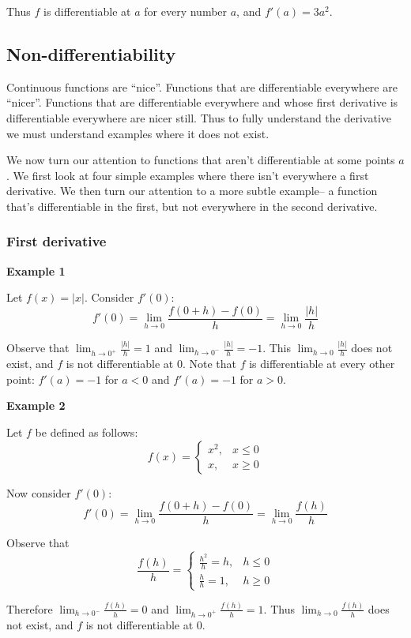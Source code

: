 Thus $f$ is differentiable at $a$ for every number $a$, and $f'(a)=3a^2$.

\subsection{Non-differentiability}
Continuous functions are ``nice''. Functions that are differentiable
everywhere are ``nicer''. Functions that are differentiable everywhere
and whose first derivative is differentiable everywhere are nicer
still. Thus to fully understand the derivative we must understand
examples where it does not exist.

\vs

We now turn our attention to functions that aren't differentiable at
some points $a$. We first look at four simple examples where there
isn't everywhere a first derivative. We then turn our attention to a
more subtle example-- a function that's differentiable in the first,
but not everywhere in the second derivative.

\subsubsection*{First derivative}

\textbf{Example 1}

Let $f(x)=|x|$. Consider $f'(0)$:
\[f'(0)=\lim_{h\to0}\frac{f(0+h)-f(0)}{h}=\lim_{h\to0}\frac{|h|}{h}\]

Observe that $\lim_{h\to0^+}\frac{|h|}{h}=1$ and
$\lim_{h\to0^-}\frac{|h|}{h}=-1$. This $\lim_{h\to0}\frac{|h|}{h}$ does
not exist, and $f$ is not differentiable at $0$. Note that $f$ is
differentiable at every other point: $f'(a)=-1$ for $a<0$ and
$f'(a)=-1$ for $a>0$.

\vs

\textbf{Example 2}

Let $f$ be defined as follows:
\[f(x)=\begin{cases}
  x^2,&x\leq 0\\
  x,&x\geq 0
\end{cases}\]

Now consider $f'(0)$:
\[f'(0)=\lim_{h\to0}\frac{f(0+h)-f(0)}{h}=\lim_{h\to0}\frac{f(h)}{h}\]

Observe that
\[\frac{f(h)}{h}=\begin{cases}
  \frac{h^2}{h}=h,&h\leq0\\
  \frac{h}{h}=1,&h\geq0
\end{cases}\]

Therefore $\lim_{h\to0^-}\frac{f(h)}{h}=0$ and
$\lim_{h\to0^+}\frac{f(h)}{h}=1$. Thus $\lim_{h\to0}\frac{f(h)}{h}$ does
not exist, and $f$ is not differentiable at $0$.


